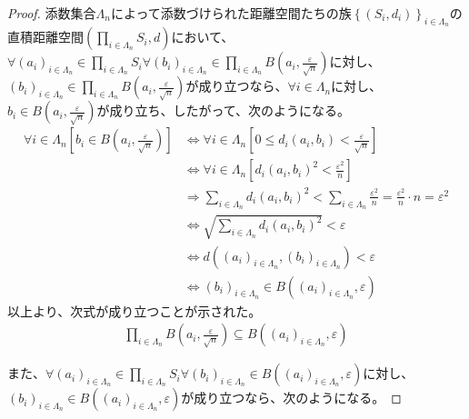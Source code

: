 \documentclass[dvipdfmx]{jsarticle}
\begin{document}
\begin{proof}
添数集合$\varLambda_{n}$によって添数づけられた距離空間たちの族$\left\{ \left( S_{i},d_{i} \right) \right\}_{i \in \varLambda_{n}}$の直積距離空間$\left( \prod_{i \in \varLambda_{n}} S_{i},d \right)$において、$\forall\left( a_{i} \right)_{i \in \varLambda_{n}} \in \prod_{i \in \varLambda_{n}} S_{i}\forall\left( b_{i} \right)_{i \in \varLambda_{n}} \in \prod_{i \in \varLambda_{n}} {B\left( a_{i},\frac{\varepsilon}{\sqrt{n}} \right)}$に対し、$\left( b_{i} \right)_{i \in \varLambda_{n}} \in \prod_{i \in \varLambda_{n}} {B\left( a_{i},\frac{\varepsilon}{\sqrt{n}} \right)}$が成り立つなら、$\forall i \in \varLambda_{n}$に対し、$b_{i} \in B\left( a_{i},\frac{\varepsilon}{\sqrt{n}} \right)$が成り立ち、したがって、次のようになる。
\begin{align*}
\forall i \in \varLambda_{n}\left[ b_{i} \in B\left( a_{i},\frac{\varepsilon}{\sqrt{n}} \right) \right] &\Leftrightarrow \forall i \in \varLambda_{n}\left[ 0 \leq d_{i}\left( a_{i},b_{i} \right) < \frac{\varepsilon}{\sqrt{n}} \right]\\
&\Leftrightarrow \forall i \in \varLambda_{n}\left[ {d_{i}\left( a_{i},b_{i} \right)}^{2} < \frac{\varepsilon^{2}}{n} \right]\\
&\Rightarrow \sum_{i \in \varLambda_{n}} {d_{i}\left( a_{i},b_{i} \right)}^{2} < \sum_{i \in \varLambda_{n}} \frac{\varepsilon^{2}}{n} = \frac{\varepsilon^{2}}{n} \cdot n = \varepsilon^{2}\\
&\Leftrightarrow \sqrt{\sum_{i \in \varLambda_{n}} {d_{i}\left( a_{i},b_{i} \right)}^{2}} < \varepsilon\\
&\Leftrightarrow d\left( \left( a_{i} \right)_{i \in \varLambda_{n}},\left( b_{i} \right)_{i \in \varLambda_{n}} \right) < \varepsilon\\
&\Leftrightarrow \left( b_{i} \right)_{i \in \varLambda_{n}} \in B\left( \left( a_{i} \right)_{i \in \varLambda_{n}},\varepsilon \right)
\end{align*}
以上より、次式が成り立つことが示された。
\begin{align*}
\prod_{i \in \varLambda_{n}} {B\left( a_{i},\frac{\varepsilon}{\sqrt{n}} \right)} \subseteq B\left( \left( a_{i} \right)_{i \in \varLambda_{n}},\varepsilon \right)
\end{align*}\par
また、$\forall\left( a_{i} \right)_{i \in \varLambda_{n}} \in \prod_{i \in \varLambda_{n}} S_{i}\forall\left( b_{i} \right)_{i \in \varLambda_{n}} \in B\left( \left( a_{i} \right)_{i \in \varLambda_{n}},\varepsilon \right)$に対し、$\left( b_{i} \right)_{i \in \varLambda_{n}} \in B\left( \left( a_{i} \right)_{i \in \varLambda_{n}},\varepsilon \right)$が成り立つなら、次のようになる。

\end{proof}
\end{document}
